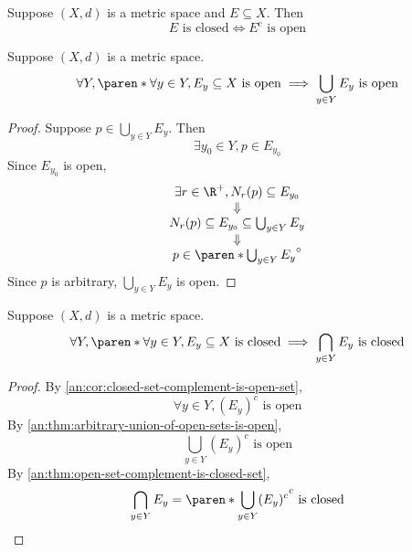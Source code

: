 \bigskip

\begin{corollary} \label{an:cor:closed-set-complement-is-open-set}
  Suppose $(X, d)$ is a metric space and $E \subseteq X$. Then
  \[
    E \text{ is closed} \iff E^{c} \text{ is open}
  \]
\end{corollary}

\bigskip

\begin{theorem} \label{an:thm:arbitrary-union-of-open-sets-is-open}
  Suppose $(X, d)$ is a metric space.
  \[
    \forall Y, \paren*{\forall y \in Y, E_{y} \subseteq X \text{ is open}} \implies \bigcup_{y \in Y} E_{y} \text{ is open}
  \]
\end{theorem}

\begin{proof}
  Suppose $p \in \bigcup_{y \in Y} E_{y}$. Then
  \[
    \exists y_{0} \in Y, p \in E_{y_{0}}
  \]
  Since $E_{y_{0}}$ is open,
  \[
    \begin{array}{c}
      \exists r \in \R^{+}, N_{r}(p) \subseteq E_{y_{0}}             \\
      \Downarrow                                                     \\
      N_{r}(p) \subseteq E_{y_{0}} \subseteq \bigcup_{y \in Y} E_{y} \\
      \Downarrow                                                     \\
      p \in \paren*{\bigcup_{y \in Y} E_{y}}^{\circ}
    \end{array}
  \]
  Since $p$ is arbitrary, $\bigcup_{y \in Y} E_{y}$ is open.
\end{proof}

\bigskip

\begin{corollary} \label{an:cor:arbitrary-intersection-of-closed-sets-is-closed}
  Suppose $(X, d)$ is a metric space.
  \[
    \forall Y, \paren*{\forall y \in Y, E_{y} \subseteq X \text{ is closed}} \implies \bigcap_{y \in Y} E_{y} \text{ is closed}
  \]
\end{corollary}

\begin{proof}
  By \cref{an:cor:closed-set-complement-is-open-set},
  \[
    \forall y \in Y, (E_{y})^{c} \text{ is open}
  \]
  By \cref{an:thm:arbitrary-union-of-open-sets-is-open},
  \[
    \bigcup_{y \in Y} (E_{y})^{c} \text{ is open}
  \]
  By \cref{an:thm:open-set-complement-is-closed-set},
  \[
    \bigcap_{y \in Y} E_{y} = \paren*{\bigcup_{y \in Y} (E_{y})^{c}}^{c} \text{ is closed}
  \]
\end{proof}

\bigskip
